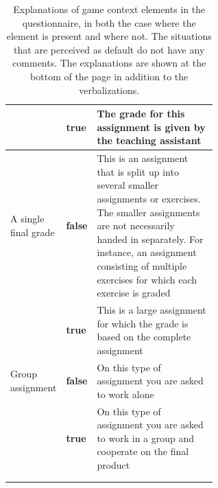 \documentclass[11pt]{article}
\begin{document}
\begin{longtable}{ll p{0.6\linewidth}}
 & \textbf{true} & The grade for this assignment is given by the teaching assistant \\ \hline
  A single final grade & \textbf{false} & This is an assignment that is split up into several smaller assignments or exercises. The smaller assignments are not necessarily handed in separately. For instance, an assignment consisting of multiple exercises for which each exercise is graded \\
  & \textbf{true} & This is a large assignment for which the grade is based on the complete assignment \\ \hline
  Group assignment & \textbf{false} & On this type of assignment you are asked to work alone \\
  & \textbf{true} & On this type of assignment you are asked to work in a group and cooperate on the final product \\ 
  \bottomrule \\
  \caption{Explanations of game context elements in the questionnaire, in both the case where the element is present and where not. The situations that are perceived as default do not have any comments. The explanations are shown at the bottom of the page in addition to the verbalizations.}
  \label{tab:questionnaire_explanations}
\end{longtable}
\end{document}
